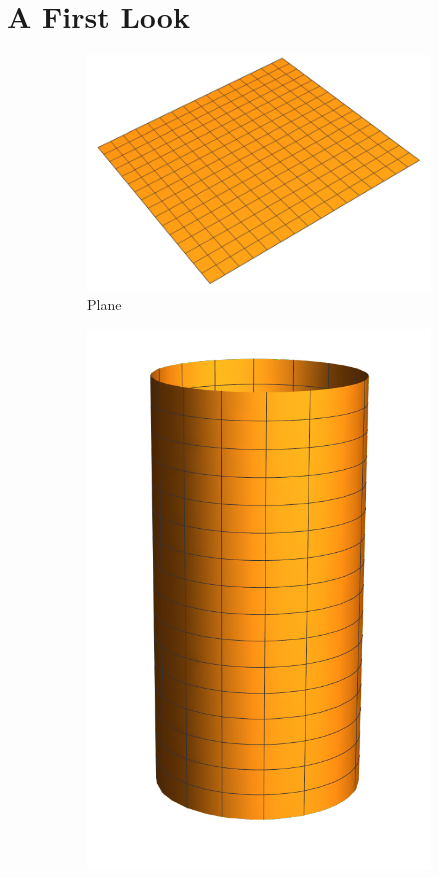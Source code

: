 \section*{A First Look}
\begin{figure}[htp]
\centering
\begin{subfigure}{0.3\textwidth}
    \centering
    \includegraphics[width=\textwidth]{picture/week4/plane.pdf}
    \caption{Plane}
\end{subfigure}
\begin{subfigure}{0.2\textwidth}
    \centering
    \includegraphics[width=\textwidth]{picture/week4/cylinder.pdf}

\end{subfigure}
\end{figure}
